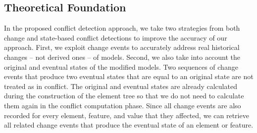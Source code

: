 \subsection{Theoretical Foundation} 
\label{sec:theoretical_foundation}
In the proposed conflict detection approach, we take two strategies from both change and state-based conflict detections to improve the accuracy of our approach. 
First, we exploit change events to accurately address real historical changes -- not derived ones -- of models. Second, we also take into account the original and eventual states of the modified models. Two sequences of change events that produce two eventual states that are equal to an original state are not treated as in conflict. The original and eventual states are already calculated during the construction of the \textsf{element tree} so that we do not need to calculate them again in the conflict computation phase. Since all change events are also recorded for every element, feature, and value that they affected, we can retrieve all related change events that produce the eventual state of an element or feature. 

